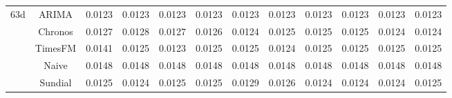 \begin{table}[H]
{\begin{tabular}{cccccccccccc}
\midrule
\multirow[c]{5}{*}{63d} & ARIMA & 0.0123 & 0.0123 & 0.0123 & 0.0123 & 0.0123 & 0.0123 & 0.0123 & 0.0123 & 0.0123 & 0.0123 \\
 & Chronos & 0.0127 & 0.0128 & 0.0127 & 0.0126 & 0.0124 & 0.0125 & 0.0125 & 0.0125 & 0.0124 & 0.0124 \\
 & TimesFM & 0.0141 & 0.0125 & 0.0123 & 0.0125 & 0.0125 & 0.0124 & 0.0125 & 0.0125 & 0.0125 & 0.0125 \\
 & Naive & 0.0148 & 0.0148 & 0.0148 & 0.0148 & 0.0148 & 0.0148 & 0.0148 & 0.0148 & 0.0148 & 0.0148 \\
 & Sundial & 0.0125 & 0.0124 & 0.0125 & 0.0125 & 0.0129 & 0.0126 & 0.0124 & 0.0124 & 0.0124 & 0.0125 \\
\bottomrule
\end{tabular}

 }
\end{table}